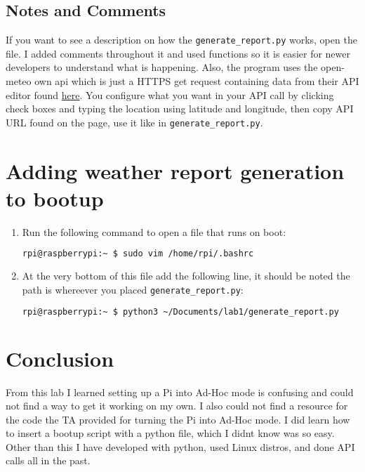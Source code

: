\documentclass{article}
\begin{document}
    \subsection{Notes and Comments}
    If you want to see a description on how the \verb|generate_report.py| works, open the file. I added comments throughout it 
    and used functions so it is easier for newer developers to understand what is happening. Also, the program uses the open-meteo
    own api which is just a HTTPS get request containing data from their API editor found \href{https://open-meteo.com/en/docs}{here}. You configure 
    what you want in your API call by clicking check boxes and typing the location using latitude and longitude, then copy API URL found on the page, 
    use it like in \verb|generate_report.py|.

    \section{Adding weather report generation to bootup}
    \begin{enumerate}
        \item Run the following command to open a file that runs on boot:
        \begin{lstlisting}[language=bash]
            rpi@raspberrypi:~ $ sudo vim /home/rpi/.bashrc
        \end{lstlisting}
        \item At the very bottom of this file add the following line, it should be noted the path is whereever you placed \verb|generate_report.py|:
        \begin{lstlisting}[language=bash]
            rpi@raspberrypi:~ $ python3 ~/Documents/lab1/generate_report.py
        \end{lstlisting}
    \end{enumerate}


    \section{Conclusion}
    From this lab I learned setting up a Pi into Ad-Hoc mode is confusing and could not 
    find a way to get it working on my own. I also could not find a resource for the code 
    the TA provided for turning the Pi into Ad-Hoc mode. I did learn how to insert a bootup 
    script with a python file, which I didnt know was so easy. Other than this I have developed with 
    python, used Linux distros, and done API calls all in the past.
\end{document}
